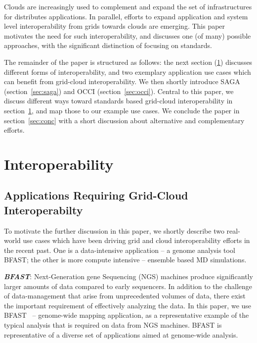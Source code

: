 \documentclass[10pt,conference,final,letterpaper,twoside,twocolumn,]{IEEEtran}
\newcommand{\I}[1]{\textit{#1}}
\newcommand{\B}[1]{\textbf{#1}}
\newcommand{\BI}[1]{\B{\I{#1}}}
\begin{document}
 Clouds are increasingly used to complement and expand the set of
 infrastructures for distributes applications.  In parallel, efforts
 to expand application and system level interoperability from grids
 towards clouds are emerging.  This paper motivates the need for such
 interoperability, and discusses one (of many) possible approaches,
 with the significant distinction of focusing on standards.

 The remainder of the paper is structured as follows: the next section
 (\ref{sec:interop}) discusses different forms of interoperability,
 and two exemplary application use cases which can benefit from
 grid-cloud interoperability.  We then shortly introduce SAGA
 (section~\ref{sec:saga}) and OCCI (section~\ref{sec:occi}).  Central
 to this paper, we discuss different ways toward standards based
 grid-cloud interoperability in section~\ref{sec:interop}, and map
 those to our example use cases.  We conclude the paper in
 section~\ref{sec:conc} with a short discussion about alternative and
 complementary efforts.



\section{Interoperability}
\label{sec:interop}

 \subsection*{Applications Requiring Grid-Cloud Interoperabilty}

 To motivate the further discussion in this paper, we shortly describe
 two real-world use cases which have been driving grid and cloud
 interoperability efforts in the recent past.  One is a data-intensive
 application -- a genome analysis tool BFAST; the other is more
 compute intensive -- ensemble based MD simulations.
 
 \BI{BFAST}: Next-Generation gene Sequencing (NGS) machines produce
 significantly larger amounts of data compared to early sequencers.
 In addition to the challenge of data-management that arise from
 unprecedented volumes of data, there exist the important requirement
 of effectively analyzing the data.  In this paper, we use
 BFAST~\cite{bfast2009,bfast2009b} -- genome-wide mapping application,
 as a representative example of the typical analysis that is required
 on data from NGS machines.  BFAST is representative of a diverse set
 of applications aimed at genome-wide analysis.
 
\end{document}
